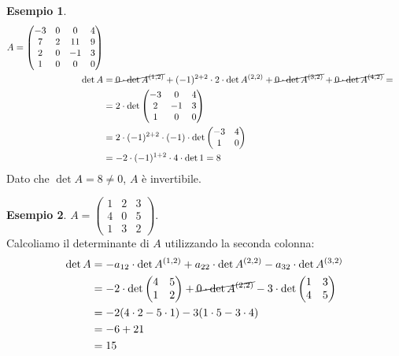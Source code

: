 \documentclass[a4paper]{article}
\theoremstyle{definition}
\newtheorem*{es}{Esempio}
\begin{document}
\begin{es}
	\begin{align*}
		A = \begin{pmatrix}
			    - 3 & 0 & 0   & 4 \\
			    7   & 2 & 11  & 9 \\
			    2   & 0 & - 1 & 3 \\
			    1   & 0 & 0   & 0
		    \end{pmatrix} \\
		\det A &= \cancel{0 \cdot \det A^{(1, 2)}} + ( - 1)^{2 + 2} \cdot 2 \cdot \det A^{(2, 2)} + \cancel{0 \cdot \det A^{(3, 2)}} + \cancel{0 \cdot \det A^{(4, 2)}} = \\
				&= 2 \cdot \det \begin{pmatrix}
									-3 & 0   & 4 \\
									2  & - 1 & 3 \\
									1  & 0   & 0
								\end{pmatrix} \\
				&= 2 \cdot ( - 1)^{2 + 2} \cdot ( - 1) \cdot \det \begin{pmatrix}
																- 3 & 4 \\
																1   & 0
															\end{pmatrix} \\
				& = - 2 \cdot ( - 1)^{1 + 2} \cdot 4 \cdot \det 1 = 8
	\end{align*}
	Dato che $\det A = 8 \neq 0$, $A$ è invertibile.
\end{es}

\begin{es}
	$A = \begin{pmatrix}
		1 & 2 & 3 \\
		4 & 0 & 5 \\
		1 & 3 & 2
	\end{pmatrix}$. \\
	Calcoliamo il determinante di $A$ utilizzando la seconda colonna:
	\begin{align*}
		\det A & = - a_{12} \cdot \det A^{(1, 2)} + a_{22} \cdot \det A^{(2, 2)} - a_{32} \cdot \det A^{(3, 2)} \\
		       & = - 2 \cdot \det \begin{pmatrix}
				       4 & 5 \\
				       1 & 2
			       \end{pmatrix} + \cancel{0 \cdot \det A^{(2, 2)}} - 3 \cdot \det \begin{pmatrix}
				       1 & 3 \\
					   4 & 5
			       \end{pmatrix} \\
		       & = - 2(4 \cdot 2 - 5 \cdot 1) - 3(1 \cdot 5 - 3 \cdot 4) \\
		       & = - 6 + 21 \\
		       & = 15
	\end{align*}
\end{es}
\end{document}
